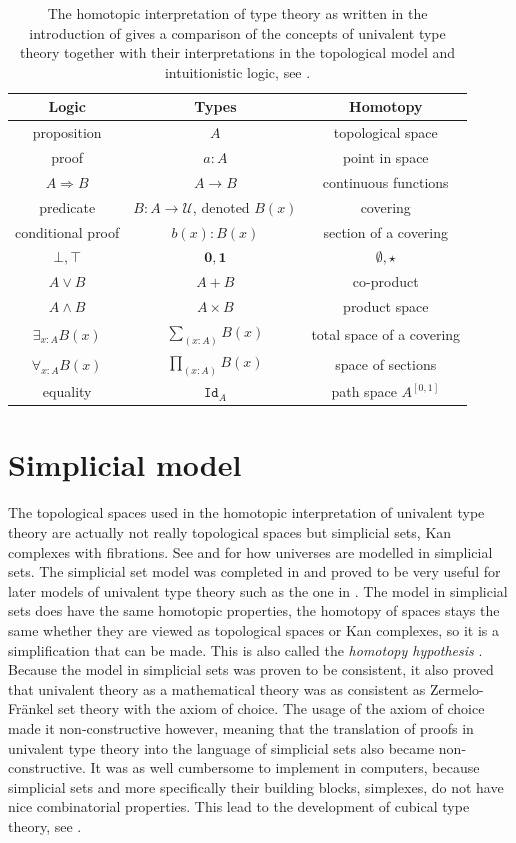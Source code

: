 \documentclass[12pt,a4paper,twoside,xetex]{book} %
\newcommand{\keyword}[1]{\emph{#1}\index{#1}}
\newcommand{\op}[1]{\mathtt{#1}}
\begin{document}
\begin{table}\label{tab:The-homotopic-interpretation}
\centering
\begin{tabular}{|c|c|c|}
\hline 
\textbf{Logic} & \textbf{Types} & \textbf{Homotopy}\tabularnewline
\hline 
proposition & $A$  & topological space\tabularnewline
proof & $a:A$ & point in space\tabularnewline 
$A\Rightarrow B$ & $A\rightarrow B$ & continuous functions\tabularnewline
predicate & $B:A\rightarrow\mathcal{U}$, denoted $B\left(x\right)$ & 
covering\tabularnewline
conditional proof & $b\left(x\right):B\left(x\right)$ & section of a 
covering\tabularnewline 
$\bot,\top$ & $\boldsymbol{0},\boldsymbol{1}$ & $\emptyset,\star$\tabularnewline
$A\vee B$ & $A+B$ & co-product\tabularnewline
$A\wedge B$ & $A\times B$ & product space\tabularnewline
$\exists_{x:A}B\left(x\right)$ & $\sum_{\left(x:A\right)}B\left(x\right)$ & 
total space of a covering\tabularnewline
$\forall_{x:A}B\left(x\right)$ & $\prod_{\left(x:A\right)}B\left(x\right)$ & 
space of sections\tabularnewline
 equality & $\op{Id}_{A}$ & path space $A^{[0,1]}$\tabularnewline
\hline 
\end{tabular}
\caption{The homotopic interpretation of type theory as written in the 
introduction of \cite{Voevodsky2013} gives a comparison of the concepts of 
univalent type theory together with their interpretations in the topological 
model and intuitionistic logic, see .}
\end{table}




\section{Simplicial model}\label{simpmod}

The topological spaces used in the homotopic interpretation of univalent type 
theory are actually not really topological spaces but simplicial 
sets, Kan complexes with fibrations. See \cite{Streicher2006} and 
\cite{Voevodsky2009} for how universes are modelled in simplicial sets. The 
simplicial set model was completed in \cite{Kapulkin2012} and proved to be very 
useful for later models of univalent type theory such as the one in 
\cite{Cohen2016}. The model in simplicial sets does have the same 
homotopic properties, the homotopy of spaces stays the same whether they are viewed 
as topological spaces or Kan complexes, so it is a simplification that can be 
made. This is also called the \keyword{homotopy hypothesis} 
\cite{Schreiber2018a}. Because the model in simplicial sets was proven to be 
consistent, it also proved that univalent theory as a mathematical theory was as 
consistent as Zermelo-Fr\"ankel set theory with the axiom of choice. The usage 
of the axiom of choice made it non-constructive however, meaning that the 
translation of proofs in univalent type theory into the language of simplicial 
sets also became non-constructive. It was as well cumbersome to implement in 
computers, because simplicial sets and more specifically their building blocks, 
simplexes, do not have nice combinatorial properties. This lead to the 
development of cubical type theory, see .
\end{document}
